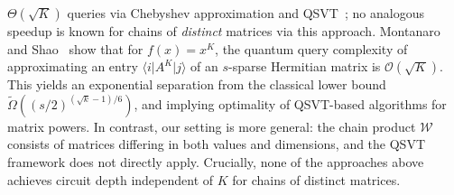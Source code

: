 \documentclass[a4paper,UKenglish,cleveref,autoref,thm-restate]{socg-lipics-v2021}
\providecommand{\ket}[1]{\lvert #1 \rangle}
\providecommand{\bra}[1]{\langle #1 \rvert}
\begin{document}
$\Theta(\sqrt{K})$ queries via Chebyshev approximation and QSVT~\cite{gilyen2019quantum}; no analogous speedup is known for chains of \emph{distinct} matrices via this approach.
Montanaro and Shao~\cite{montanaro2024quantum} show that for $f(x)=x^K$, the quantum query complexity of approximating an entry  $\bra{i}A^K\ket{j}$ of an $s$-sparse Hermitian matrix is $\mathcal{O}(\sqrt{K})$. This yields an exponential separation from the classical lower bound $\widetilde\Omega\!\left((s/2)^{(\sqrt{k}-1)/6}\right)$, and implying optimality of QSVT-based algorithms for matrix powers. In contrast, our setting is more general: the chain product $\mathcal{W}$ consists of matrices differing in both values and dimensions, and the  QSVT framework does not directly apply. Crucially, none of the approaches above achieves circuit depth independent of $K$ for chains of distinct matrices. 
\end{document}
